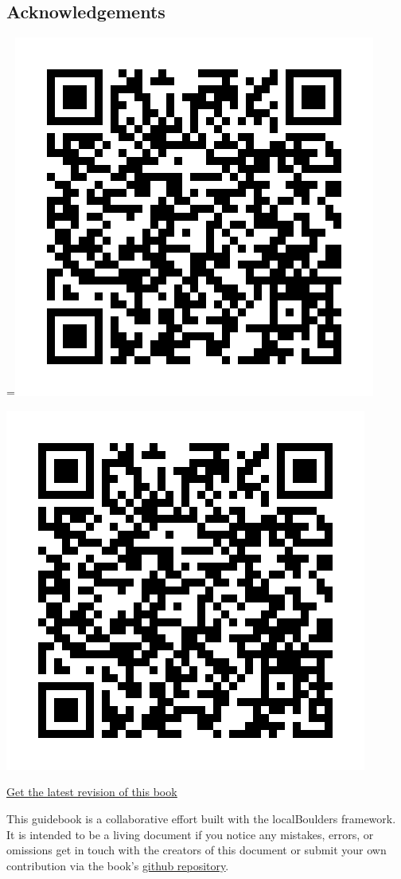 \raggedcolumns
\begin{multicols}{2}

\section{Acknowledgements}
=\hbox{\includegraphics[width=0.45\linewidth]{./maps/qr/The Crops_qr.png}}%
\begin{center}
\includegraphics[width=0.45\linewidth]{./maps/qr/The Crops_qr.png}
\end{center}
\begin{center}
\underline{\textcolor{blue}{\href{https://github.com/AndrewChild/The-Crops-Guidebook/raw/main/The_Crops_Guide.pdf}{Get the latest revision of this book}}}
\end{center}

This guidebook is a collaborative effort built with the localBoulders framework. It is intended to be a living document if you notice any mistakes, errors, or omissions get in touch with the creators of this document or submit your own contribution via the book's \underline{\textcolor{blue}{\href{https://github.com/AndrewChild/The-Crops-Guidebook}{github repository}}}.
\end{multicols}
\clearpage